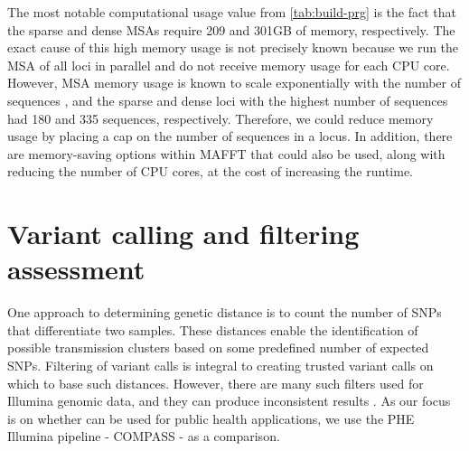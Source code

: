 \begin{table}
\centering
{}
\caption{Computational time and memory (RAM) usage for the main steps of building a \mtb{} reference graph. Sparse and Dense refer to two different densities with respect to the number of variants used. All steps were run on a single compute node with 32 CPU cores. MSA=multiple sequence alignment;PRG=population reference graph.}
\label{tab:build-prg}
\end{table}

The most notable computational usage value from \autoref{tab:build-prg} is the fact that the sparse and dense MSAs require 209 and 301GB of memory, respectively. The exact cause of this high memory usage is not precisely known because we run the MSA of all loci in parallel and do not receive memory usage for each CPU core. However, MSA memory usage is known to scale exponentially with the number of sequences \cite{Wang1994}, and the sparse and dense loci with the highest number of sequences had 180 and 335 sequences, respectively. Therefore, we could reduce memory usage by placing a cap on the number of sequences in a locus. In addition, there are memory-saving options within MAFFT that could also be used, along with reducing the number of CPU cores, at the cost of increasing the runtime.


\section{Variant calling and filtering assessment}
\label{sec:var-calls}
One approach to determining genetic distance is to count the number of SNPs that differentiate two samples. These distances enable the identification of possible transmission clusters based on some predefined number of expected SNPs. Filtering of variant calls is integral to creating trusted variant calls on which to base such distances. However, there are many such filters used for Illumina genomic data, and they can produce inconsistent results \cite{walter2020}. As our focus is on whether \ont{} can be used for public health applications, we use the PHE Illumina pipeline - COMPASS \cite{Jajou2019} - as a comparison.

